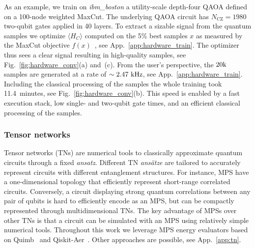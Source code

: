 \documentclass[twocolumn,
english,
aps,
pra,
10pt,
longbibliography,
superscriptaddress,
amsmath,
amssymb,
floatfix
]{revtex4-2}
\begin{document}
As an example, we train on \emph{ibm\_boston} a utility-scale depth-four QAOA defined on a 100-node weighted MaxCut.
The underlying QAOA circuit has $N_\text{CZ}=1980$ two-qubit gates applied in 40 layers.
To extract a sizable signal from the quantum samples we optimize $\langle H_C\rangle$ computed on the 5\% best samples $x$ as measured by the MaxCut objective $f(x)$~\cite{Barron2024}, see App.~\ref{app:hardware_train}.
The optimizer thus sees a clear signal resulting in high-quality samples, see Fig.~\ref{fig:hardware_conv}(a) and~(c).
From the user's perspective, the $20{\rm k}$ samples are generated at a rate of $\sim 2.47~\rm{kHz}$, see App.~\ref{app:hardware_train}.
Including the classical processing of the samples the whole training took 11.4~minutes, see Fig.~\ref{fig:hardware_conv}(b).
This speed is enabled by a fast execution stack, low single- and two-qubit gate times, and an efficient classical processing of the samples.

\subsubsection{Tensor networks\label{sec:tns}}

Tensor networks (TNs) are numerical tools to classically approximate quantum circuits through a fixed \textit{ansatz}.
Different TN \textit{ans\"atze} are tailored to accurately represent circuits with different entanglement structures.
For instance, MPS have a one-dimensional topology that efficiently represent short-range correlated circuits.
Conversely, a circuit displaying strong quantum correlations between any pair of qubits is hard to efficiently encode as an MPS, but can be compactly represented through multidimensional TNs. 
The key advantage of MPSs over other TNs is that a circuit can be simulated with an MPS using relatively simple numerical tools.
Throughout this work we leverage MPS energy evaluators based on Quimb~\cite{Gray2018} and Qiskit-Aer~\cite{Qiskit}.
Other approaches are possible, see App.~\ref{app:tn}.
\end{document}
